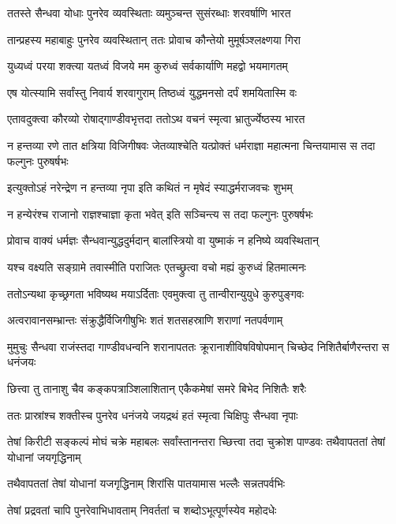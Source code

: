 \twolineshloka
{ततस्ते सैन्धवा योधाः पुनरेव व्यवस्थिताः}
{व्यमुञ्चन्त सुसंरब्धाः शरवर्षाणि भारत}


\twolineshloka
{तान्प्रहस्य महाबाहुः पुनरेव व्यवस्थितान्}
{ततः प्रोवाच कौन्तेयो मुमूर्षञ्श्लक्ष्णया गिरा}


\twolineshloka
{युध्यध्वं परया शक्त्या यतध्वं विजये मम}
{कुरुध्वं सर्वकार्याणि महद्वो भयमागतम्}


\twolineshloka
{एष योत्स्यामि सर्वांस्तु निवार्य शरवागुराम्}
{तिष्ठध्वं युद्धमनसो दर्पं शमयितास्मि वः}


\twolineshloka
{एतावदुक्त्वा कौरव्यो रोषाद्गाण्डीवभृत्तदा}
{ततोऽथ वचनं स्मृत्वा भ्रातुर्ज्येष्ठस्य भारत}


\threelineshloka
{न हन्तव्या रणे तात क्षत्रिया विजिगीषवः}
{जेतव्याश्चेति यत्प्रोक्तं धर्मराज्ञा महात्मना}
{चिन्तयामास स तदा फल्गुनः पुरुषर्षभः}


\twolineshloka
{इत्युक्तोऽहं नरेन्द्रेण न हन्तव्या नृपा इति}
{कथितं न मृषेदं स्याद्धर्मराजवचः शुभम्}


\twolineshloka
{न हन्येरंश्च राजानो राज्ञश्चाज्ञा कृता भवेत्}
{इति सञ्चिन्त्य स तदा फल्गुनः पुरुषर्षभः}


\twolineshloka
{प्रोवाच वाक्यं धर्मज्ञः सैन्धवान्युद्धदुर्मदान्}
{बालांस्त्रियो वा युष्माकं न हनिष्ये व्यवस्थितान्}


\twolineshloka
{यश्च वक्ष्यति सङ्ग्रामे तवास्मीति पराजितः}
{एतच्छ्रुत्वा वचो मह्यं कुरुध्वं हितमात्मनः}


\twolineshloka
{ततोऽन्यथा कृच्छ्रगता भविष्यथ मयाऽर्दिताः}
{एवमुक्त्वा तु तान्वीरान्युयुधे कुरुपुङ्गवः}


\twolineshloka
{अत्वरावानसम्भ्रान्तः संक्रुद्धैर्विजिगीषुभिः}
{शतं शतसहस्राणि शराणां नतपर्वणाम्}


\threelineshloka
{मुमुचुः सैन्धवा राजंस्तदा गाण्डीवधन्वनि}
{शरानापततः क्रूरानाशीविषविषोपमान्}
{चिच्छेद निशितैर्बाणैरन्तरा स धनंजयः}


\twolineshloka
{छित्त्वा तु तानाशु चैव कङ्कपत्राञ्शिलाशितान्}
{एकैकमेषां समरे बिभेद निशितैः शरैः}


\twolineshloka
{ततः प्रास्रांश्च शक्तीस्च पुनरेव धनंजये}
{जयद्रथं हतं स्मृत्वा चिक्षिपुः सैन्धवा नृपाः}


\fourlineindentedshloka
{तेषां किरीटी सङ्कल्पं मोघं चक्रे महाबलः}
{सर्वांस्तानन्तरा च्छित्त्वा तदा चुक्रोश पाण्डवः}
{तथैवापततां तेषां योधानां जयगृद्धिनाम्}
{}


\twolineshloka
{तथैवापततां तेषां योधानां यजगृद्धिनाम्}
{शिरांसि पातयामास भल्लैः सन्नतपर्वभिः}


\twolineshloka
{तेषां प्रद्रवतां चापि पुनरेवाभिधावताम्}
{निवर्ततां च शब्दोऽभूत्पूर्णस्येव महोदधेः}


